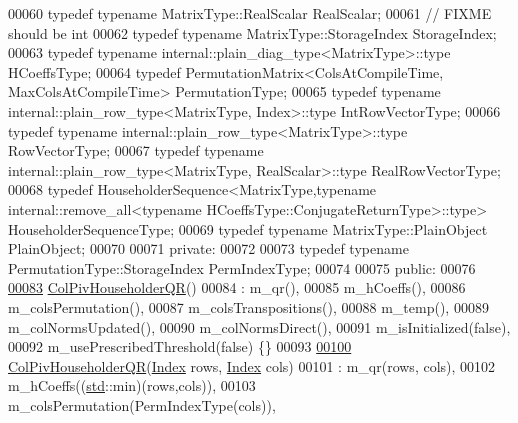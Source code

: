 \begin{DoxyCode}
00060     \textcolor{keyword}{typedef} \textcolor{keyword}{typename} MatrixType::RealScalar RealScalar;
00061     \textcolor{comment}{// FIXME should be int}
00062     \textcolor{keyword}{typedef} \textcolor{keyword}{typename} MatrixType::StorageIndex StorageIndex;
00063     \textcolor{keyword}{typedef} \textcolor{keyword}{typename} internal::plain\_diag\_type<MatrixType>::type HCoeffsType;
00064     \textcolor{keyword}{typedef} PermutationMatrix<ColsAtCompileTime, MaxColsAtCompileTime> PermutationType;
00065     \textcolor{keyword}{typedef} \textcolor{keyword}{typename} internal::plain\_row\_type<MatrixType, Index>::type IntRowVectorType;
00066     \textcolor{keyword}{typedef} \textcolor{keyword}{typename} internal::plain\_row\_type<MatrixType>::type RowVectorType;
00067     \textcolor{keyword}{typedef} \textcolor{keyword}{typename} internal::plain\_row\_type<MatrixType, RealScalar>::type RealRowVectorType;
00068     \textcolor{keyword}{typedef} HouseholderSequence<MatrixType,typename internal::remove\_all<typename
       HCoeffsType::ConjugateReturnType>::type> HouseholderSequenceType;
00069     \textcolor{keyword}{typedef} \textcolor{keyword}{typename} MatrixType::PlainObject PlainObject;
00070 
00071   \textcolor{keyword}{private}:
00072 
00073     \textcolor{keyword}{typedef} \textcolor{keyword}{typename} PermutationType::StorageIndex PermIndexType;
00074 
00075   \textcolor{keyword}{public}:
00076 
\hyperlink{group___q_r___module_a9d8a92c2a2f0debe5454812372237ed4}{00083}     \hyperlink{group___q_r___module_a9d8a92c2a2f0debe5454812372237ed4}{ColPivHouseholderQR}()
00084       : m\_qr(),
00085         m\_hCoeffs(),
00086         m\_colsPermutation(),
00087         m\_colsTranspositions(),
00088         m\_temp(),
00089         m\_colNormsUpdated(),
00090         m\_colNormsDirect(),
00091         m\_isInitialized(false),
00092         m\_usePrescribedThreshold(false) \{\}
00093 
\hyperlink{group___q_r___module_a5965d4fdebc04b2df71d67ff0b2d0c2c}{00100}     \hyperlink{group___q_r___module_a5965d4fdebc04b2df71d67ff0b2d0c2c}{ColPivHouseholderQR}(\hyperlink{namespace_eigen_a62e77e0933482dafde8fe197d9a2cfde}{Index} rows, \hyperlink{namespace_eigen_a62e77e0933482dafde8fe197d9a2cfde}{Index} cols)
00101       : m\_qr(rows, cols),
00102         m\_hCoeffs((\hyperlink{namespacestd}{std}::min)(rows,cols)),
00103         m\_colsPermutation(PermIndexType(cols)),

\end{DoxyCode}
